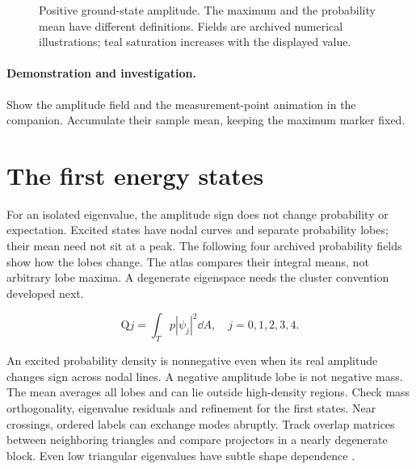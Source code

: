 \documentclass[11pt,oneside,openany]{book}
\begin{document}
\begin{figure}[htbp]
\caption[Positive ground-state amplitude]{Positive ground-state amplitude. The maximum and the probability mean have different definitions. Fields are archived numerical illustrations; teal saturation increases with the displayed value.}\label{fig:field-Q0m}
\end{figure}

\paragraph{Demonstration and investigation.} Show the amplitude field and the measurement-point animation in the companion. Accumulate their sample mean, keeping the maximum marker fixed.


\section{The first energy states}\label{sec:slide50}

For an isolated eigenvalue, the amplitude sign does not change
probability or expectation. Excited states have nodal curves and
separate probability lobes; their mean need not sit at a peak.
The following four archived probability fields show how the lobes
change. The atlas compares their integral means, not arbitrary
lobe maxima. A degenerate eigenspace needs the cluster convention
developed next.


\[\mathrm{Q}j=\int_Tp|\psi_j|^2\dd A,\quad j=0,1,2,3,4.\]



An excited probability density is nonnegative even when its real
amplitude changes sign across nodal lines. A negative amplitude
lobe is not negative mass. The mean averages all lobes and can lie
outside high-density regions. Check mass orthogonality, eigenvalue
residuals and refinement for the first states.
Near crossings, ordered labels can exchange modes abruptly.
Track overlap matrices between neighboring triangles and compare
projectors in a nearly degenerate block. Even low triangular
eigenvalues have subtle shape dependence \cite{endo}.
\end{document}
